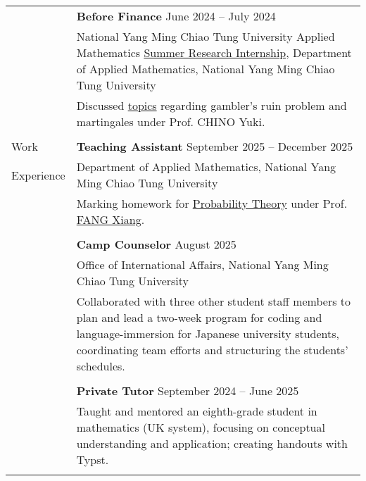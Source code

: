 \documentclass[letterpaper, 11pt]{article}
\begin{document}
\begin{center}
\begin{longtable}{p{0.76in}p{5.93in}}
        & \textbf{Before Finance} \hfill June 2024 -- July 2024\\
        & National Yang Ming Chiao Tung University Applied Mathematics \href{https://teshenglin.github.io/courses/2024_summer_research/}{Summer Research Internship}, Department of Applied Mathematics, National Yang Ming Chiao Tung University\\
        & Discussed \href{https://hackmd.io/@eiken-sc11/B1QcaW3B0}{topics} regarding gambler's ruin problem and martingales under Prof. CHINO Yuki.\\
        & \\
        


        {\textcolor{OliveGreen}{Work}} & \textbf{Teaching Assistant}  \hfill September 2025 -- December 2025 \\
        {\textcolor{OliveGreen}{Experience}} & Department of Applied Mathematics, National Yang Ming Chiao Tung University\\
        & Marking homework for \href{https://reurl.cc/qYaYr3}{Probability Theory} under Prof. \href{https://www.math.nycu.edu.tw/faculty/e_faculty_content.php?S_ID=149&SC_ID=1}{FANG Xiang}.\\
        & \\

        & \textbf{Camp Counselor} \hfill August 2025 \\
        & Office of International Affairs, National Yang Ming Chiao Tung University \\
        & Collaborated with three other student staff members to plan and lead a two-week program for coding and language-immersion for Japanese university students, coordinating team efforts and structuring the students' schedules.\\
        & \\

        & \textbf{Private Tutor} \hfill September 2024 -- June 2025 \\
        & Taught and mentored an eighth-grade student in mathematics (UK system), focusing on conceptual understanding and application; creating handouts with Typst.\\
        & \\
        


\end{longtable}
\end{center}
\end{document}
